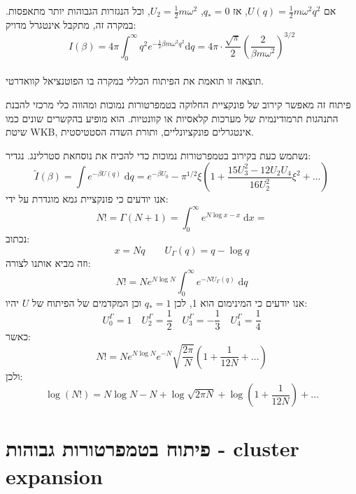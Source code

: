 \documentclass{tstextbook}
\begin{document}
\begin{example}
אם \(U(q) = \frac{1}{2} m \omega^2 q^2\), אז \(q_* = 0\), \(U_2 = \frac{1}{2} m \omega^2\), וכל הנגזרות הגבוהות יותר מתאפסות. במקרה זה, מתקבל אינטגרל מדויק:\\
$$I(\beta) = 4\pi \int_0^\infty q^2 e^{ -\frac{1}{2} \beta m \omega^2 q^2 } \mathrm{d}q = 4\pi \cdot \frac{\sqrt{\pi}}{2} \left( \frac{2}{\beta m \omega^2} \right)^{3/2}
$$\\

תוצאה זו תואמת את הפיתוח הכללי במקרה בו הפוטנציאל קוואדרטי.

\end{example}
\begin{remark}
פיתוח זה מאפשר קירוב של פונקציית החלוקה בטמפרטורות נמוכות ומהווה כלי מרכזי להבנת התנהגות תרמודינמית של מערכות קלאסיות או קוונטיות. הוא מופיע בהקשרים שונים כמו שיטת WKB, אינטגרלים פונקציונליים, ותורת השדה הסטטיסטית.

\end{remark}
\begin{example}
נשתמש כעת בקירוב בטמפרטורות נמוכות כדי להכיח את נוסחאת סטרלינג.
נגדיר:
$$\tilde{I}(\beta)=\int e^{ -\beta U(q) } \;\mathrm{d}q=e^{ -\beta U_{0} }-\pi^{1/2}\xi\left( 1+ \frac{15U_{3}^{2}-12U_{2}U_{4}}{16 U_{2}^{2}}\xi^{2}+\dots \right)$$
אנו יודעים כי פונקציית גמא מוגדרת על ידי:
$$N! = \Gamma(N+1)=\int _{0}^{\infty}e^{ N\log x-x } \;\mathrm{d}x=$$
נכתוב:
$$x=Nq \qquad U_{\Gamma}(q)=q-\log q$$
וזה מביא אותנו לצורה:
$$N! = Ne^{ N\log N }\int _{0}^{\infty}e^{ -NU_{\Gamma}(q) } \;\mathrm{d}q$$
אנו יודעים כי המינימום הוא 1, לכן \(q_{*}=1\) וכן המקדמים של הפיתוח של \(U\) יהיו:
$$U_{0}^{\Gamma} = 1\quad U_{2}^{\Gamma}=\frac{1}{2}\quad U_{3}^{\Gamma}=-\frac{1}{3}\quad U_{4}^{\Gamma}=\frac{1}{4}$$
כאשר:
$$N! = Ne^{ N\log N }e^{ -N }\sqrt{ \frac{2\pi}{N} }\left( 1+\frac{1}{12N}+\dots \right)$$
ולכן:
$$\log(N!)=N\log N-N+\log \sqrt{ 2\pi N }+\log\left( 1+\frac{1}{12N} \right)+\dots$$

\end{example}
\section{פיתוח בטמפרטורות גבוהות - cluster expansion}
\end{document}
